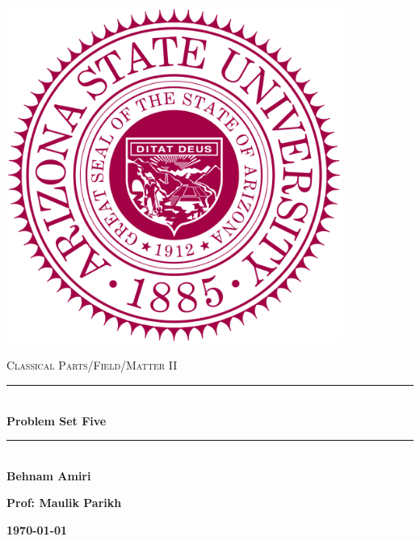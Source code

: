 \documentclass[fleqn]{article}
\begin{document}
  \begin{titlepage}

    \newcommand{\HRule}{\rule{\linewidth}{0.5mm}}

    \center

    \begin{center}
      \includegraphics[height=11cm, width=11cm]{asu.png}
    \end{center}

    \vline

    \textsc{\LARGE Classical Parts/Field/Matter II}\\[1.5cm]

    \HRule \\[0.5cm]
    { \huge \bfseries Problem Set Five}\\[0.4cm] 
    \HRule \\[1.0cm]

    \textbf{Behnam Amiri}

    \bigbreak

    \textbf{Prof: Maulik Parikh}

    \bigbreak

    \textbf{{\large \today}\\[2cm]}

    \vfill

  \end{titlepage}
\end{document}
